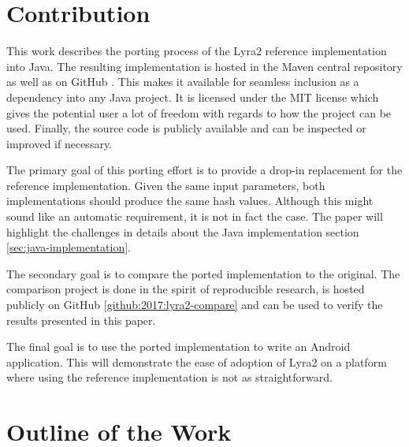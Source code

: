 \section{Contribution}
This work describes the porting process of the Lyra2 reference implementation into Java. The resulting implementation is hosted in the Maven central repository \cite{maven:2017:lyra2} as well as on GitHub \cite{github:2017:lyra2-java}. This makes it available for seamless inclusion as a dependency into any Java project. It is licensed under the MIT license which gives the potential user a lot of freedom with regards to how the project can be used. Finally, the source code is publicly available and can be inspected or improved if necessary.

The primary goal of this porting effort is to provide a drop-in replacement for the reference implementation. Given the same input parameters, both implementations should produce the same hash values. Although this might sound like an automatic requirement, it is not in fact the case. The paper will highlight the challenges in details about the Java implementation section \ref{sec:java-implementation}.

The secondary goal is to compare the ported implementation to the original. The comparison project is done in the spirit of reproducible research, is hosted publicly on GitHub \ref{github:2017:lyra2-compare} and can be used to verify the results presented in this paper.

The final goal is to use the ported implementation to write an Android application. This will demonstrate the ease of adoption of Lyra2 on a platform where using the reference implementation is not as straightforward.

\section{Outline of the Work}

